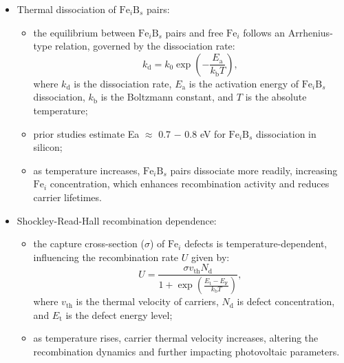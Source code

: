 \documentclass[a4paper,fleqn]{cas-sc}
\begin{document}
\begin{itemize}
    \item Thermal dissociation of $\mathrm{Fe}_i\mathrm{B}_s$ pairs:
    \begin{itemize}
        \item the equilibrium between $\mathrm{Fe}_i\mathrm{B}_s$ pairs and free $\mathrm{Fe}_i$ follows an Arrhenius-type relation, governed by the dissociation rate:
        \begin{equation}
        \label{eq1}
            k_\mathrm{d}  = k_\mathrm{0} \exp(-\frac{E_\mathrm{a}}{k_\mathrm{b}T}),
        \end{equation}
        where $k_\mathrm{d}$ is the dissociation rate, $E_\mathrm{a}$ is the activation energy of $\mathrm{Fe}_i\mathrm{B}_s$ dissociation, $k_\mathrm{b}$ is the Boltzmann constant, and $T$ is the absolute temperature;
        \item prior studies estimate Ea $\approx$ 0.7 $-$ 0.8 eV for $\mathrm{Fe}_i\mathrm{B}_s$ dissociation in silicon;
        \item as temperature increases, $\mathrm{Fe}_i\mathrm{B}_s$ pairs dissociate more readily, increasing $\mathrm{Fe}_i$ concentration, which enhances recombination activity and reduces carrier lifetimes.
    \end{itemize}
    \item Shockley-Read-Hall recombination dependence:
    \begin{itemize}
        \item the capture cross-section ($\sigma$) of $\mathrm{Fe}_i$ defects is temperature-dependent, influencing the recombination rate $U$ given by:
        \begin{equation}
        \label{eq2}
            U  = \frac{\sigma v_\mathrm{th} N_\mathrm{d}}{1 + \exp(\frac{E_\mathrm{t} - E_\mathrm{F}}{k_\mathrm{b}T})},
        \end{equation}
        where $v_\mathrm{th}$ is the thermal velocity of carriers, $N_\mathrm{d}$ is defect concentration, and $E_\mathrm{t}$ is the defect energy level;
        \item as temperature rises, carrier thermal velocity increases, altering the recombination dynamics and further impacting photovoltaic parameters.
    \end{itemize}
\end{itemize}
\end{document}
